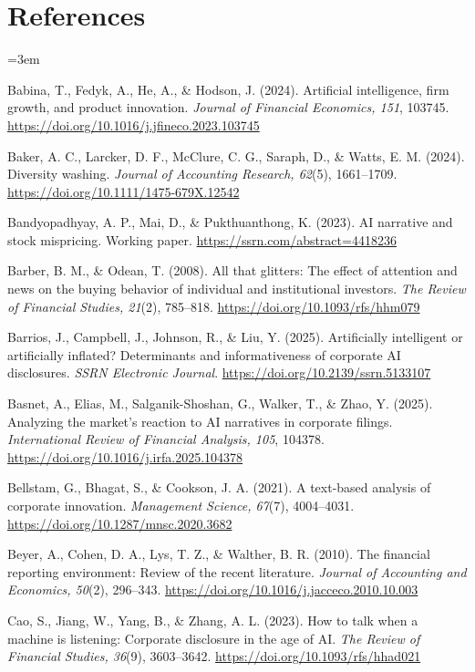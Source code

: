 \clearpage
\section*{References}

\begingroup
\small
\raggedright
\setlength{\parindent}{0pt}
\setlength{\parskip}{0.6em}
\emergencystretch=3em
\sloppy

Babina, T., Fedyk, A., He, A., \& Hodson, J. (2024). Artificial intelligence, firm growth, and product innovation. \textit{Journal of Financial Economics, 151}, 103745. \url{https://doi.org/10.1016/j.jfineco.2023.103745}

Baker, A. C., Larcker, D. F., McClure, C. G., Saraph, D., \& Watts, E. M. (2024). Diversity washing. \textit{Journal of Accounting Research, 62}(5), 1661--1709. \url{https://doi.org/10.1111/1475-679X.12542}

Bandyopadhyay, A. P., Mai, D., \& Pukthuanthong, K. (2023). AI narrative and stock mispricing. Working paper. \url{https://ssrn.com/abstract=4418236}

Barber, B. M., \& Odean, T. (2008). All that glitters: The effect of attention and news on the buying behavior of individual and institutional investors. \textit{The Review of Financial Studies, 21}(2), 785--818. \url{https://doi.org/10.1093/rfs/hhm079}

Barrios, J., Campbell, J., Johnson, R., \& Liu, Y. (2025). Artificially intelligent or artificially inflated? Determinants and informativeness of corporate AI disclosures. \textit{SSRN Electronic Journal}. \url{https://doi.org/10.2139/ssrn.5133107}

Basnet, A., Elias, M., Salganik-Shoshan, G., Walker, T., \& Zhao, Y. (2025). Analyzing the market’s reaction to AI narratives in corporate filings. \textit{International Review of Financial Analysis, 105}, 104378. \url{https://doi.org/10.1016/j.irfa.2025.104378}

Bellstam, G., Bhagat, S., \& Cookson, J. A. (2021). A text-based analysis of corporate innovation. \textit{Management Science, 67}(7), 4004--4031. \url{https://doi.org/10.1287/mnsc.2020.3682}

Beyer, A., Cohen, D. A., Lys, T. Z., \& Walther, B. R. (2010). The financial reporting environment: Review of the recent literature. \textit{Journal of Accounting and Economics, 50}(2), 296--343. \url{https://doi.org/10.1016/j.jacceco.2010.10.003}

Cao, S., Jiang, W., Yang, B., \& Zhang, A. L. (2023). How to talk when a machine is listening: Corporate disclosure in the age of AI. \textit{The Review of Financial Studies, 36}(9), 3603--3642. \url{https://doi.org/10.1093/rfs/hhad021}

